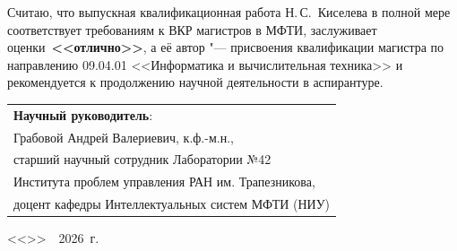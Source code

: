\documentclass[11pt,a4paper]{extarticle}
\begin{document}
Считаю, что выпускная квалификационная работа Н.\,С.~Киселева в полной мере соответствует требованиям к ВКР магистров в МФТИ, заслуживает оценки~\textbf{<<отлично>>}, а её автор "--- присвоения квалификации магистра по направлению 09.04.01 <<Информатика и вычислительная техника>> и рекомендуется к продолжению научной деятельности в аспирантуре.

\vspace{0.5em}

\begin{flushleft}
\hfill\begin{tabular}{l}
\textbf{Научный руководитель}:\\
Грабовой Андрей Валериевич, к.ф.-м.н.,\\
старший научный сотрудник Лаборатории №42\\
Института проблем управления РАН им. Трапезникова,\\
доцент кафедры Интеллектуальных систем МФТИ (НИУ)
\end{tabular}
\end{flushleft}

\vfill

\begin{flushright}
    <<\underline{\hspace{1cm}}>>\ \underline{\hspace{2.5cm}}\ 2026~г.
\end{flushright}
\end{document}
